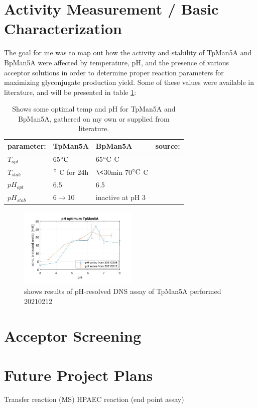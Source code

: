 \documentclass{article}
\begin{document}
\section{Activity Measurement / Basic Characterization}
The goal for me was to map out how the activity and stability of TpMan5A and BpMan5A were affected by temperature, pH, and the presence of various acceptor solutions in order to determine proper reaction parameters for maximizing glyconjugate production yield. Some of these values were available in literature, and will be presented in table \ref{tab:temp_pH_opt}:

\begin{table}[ht]
\centering
  \begin{tabular}{llll}
  \hline
    parameter: & TpMan5A              & BpMan5A              & source: \\
    \hline
    $T_{opt}$    & 65$\celsius$             & 65$\celsius$ C          &  \\
    $T_{stab}$   & \>90$\degree$ C for 24h & $\<$30min 70$\celsius$ C  &  \\
    $pH_{opt}$   &  6.5                    & 6.5                    &  \\
    $pH_{stab}$  & 6$\rightarrow$10        & inactive at pH 3       &  \\
    \hline
  \end{tabular}
  \caption{Shows some optimal temp and pH for TpMan5A and BpMan5A, gathered on my own or supplied from literature.}
  \label{tab:temp_pH_opt}
\end{table} %


\begin{figure}[h]
    \centering
    \includegraphics[width=0.5\textwidth]{figures/pH_optimum.jpg}
    \caption{shows results of pH-resolved DNS assay of TpMan5A performed 20210212}
    \label{fig:pH-optimum}
\end{figure} %

\section{Acceptor Screening}

\section{Future Project Plans}
Transfer reaction (MS)
HPAEC reaction (end point assay)

\newpage
\printbibliography
\end{document}
